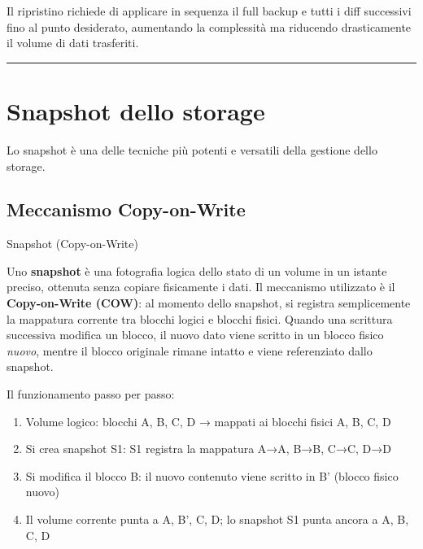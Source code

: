 \documentclass[
  italian,
  openany]{book}
\providecommand{\tightlist}{%
  \setlength{\itemsep}{0pt}\setlength{\parskip}{0pt}}
\begin{document}
Il ripristino richiede di applicare in sequenza il full backup e tutti i
diff successivi fino al punto desiderato, aumentando la complessità ma
riducendo drasticamente il volume di dati trasferiti.

\begin{center}\rule{0.5\linewidth}{0.5pt}\end{center}

\section{Snapshot dello storage}\label{snapshot-dello-storage}

Lo snapshot è una delle tecniche più potenti e versatili della gestione
dello storage.

\subsection{Meccanismo Copy-on-Write}\label{meccanismo-copy-on-write}

\begin{calloutdefinition}{Snapshot (Copy-on-Write)}

Uno \textbf{snapshot} è una fotografia logica dello stato di un volume
in un istante preciso, ottenuta senza copiare fisicamente i dati. Il
meccanismo utilizzato è il \textbf{Copy-on-Write (COW)}: al momento
dello snapshot, si registra semplicemente la mappatura corrente tra
blocchi logici e blocchi fisici. Quando una scrittura successiva
modifica un blocco, il nuovo dato viene scritto in un blocco fisico
\emph{nuovo}, mentre il blocco originale rimane intatto e viene
referenziato dallo snapshot.

\end{calloutdefinition}

Il funzionamento passo per passo:

\begin{enumerate}
\def\labelenumi{\arabic{enumi}.}
\tightlist
\item
  Volume logico: blocchi A, B, C, D → mappati ai blocchi fisici A, B, C,
  D
\item
  Si crea snapshot S1: S1 registra la mappatura A→A, B→B, C→C, D→D
\item
  Si modifica il blocco B: il nuovo contenuto viene scritto in B'
  (blocco fisico nuovo)
\item
  Il volume corrente punta a A, B', C, D; lo snapshot S1 punta ancora a
  A, B, C, D
\end{enumerate}
\end{document}
